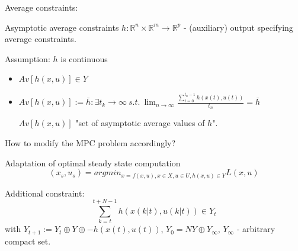 Average constraints:

\begin{Definition}
Asymptotic average constraints $h: \mathbb{R}^n \times \mathbb{R}^m \to \mathbb{R}^p$ - (auxiliary) output specifying average constraints.
\end{Definition}

Assumption: $h$ is continuous
\begin{itemize}
\item $Av[h(x,u)] \in Y$
\item $Av[h(x,u)] := {\bar{h}: \exists {t_k} \to \infty \ s.t. \ \lim_{n \to \infty} \frac{\sum_{t=0}^{t_n - 1}h(x(t),u(t))}{t_n}} = \bar{h}$

$Av[h(x,u)]$ "set of asymptotic average values of $h$".
\end{itemize}

How to modify the MPC problem accordingly?

Adaptation of optimal steady state computation
\begin{equation*}
(x_s,u_s) = argmin_{x = f(x,u), x \in X, u \in U, h(x,u) \in Y} L(x,u)
\end{equation*}

Additional constraint:
\begin{equation*}
\sum_{k=t}^{t+N-1}h(x(k|t),u(k|t)) \in Y_t
\end{equation*}
with $Y_{t+1} := Y_t \oplus Y \oplus {-h(x(t),u(t))}$, $Y_0 = NY \oplus Y_{\infty}$, $Y_{\infty}$ - arbitrary compact set.

